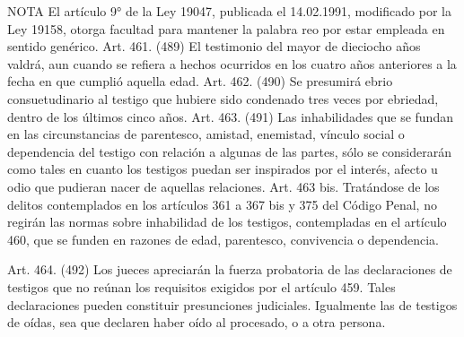 NOTA
    El artículo 9° de la Ley 19047, publicada el 14.02.1991, modificado por la Ley 19158, otorga facultad para mantener la palabra reo por estar empleada en sentido genérico.
    Art. 461. (489) El testimonio del mayor de dieciocho años valdrá, aun cuando se refiera a hechos ocurridos en los cuatro años anteriores a la fecha en que cumplió aquella edad.
    Art. 462. (490) Se presumirá ebrio consuetudinario al testigo que hubiere sido condenado tres veces por ebriedad, dentro de los últimos cinco años.
    Art. 463. (491) Las inhabilidades que se fundan en las circunstancias de parentesco, amistad, enemistad, vínculo social o dependencia del testigo con relación a algunas de las partes, sólo se considerarán como tales en cuanto los testigos puedan ser inspirados por el interés, afecto u odio que pudieran nacer de aquellas relaciones.
    Art. 463 bis. Tratándose de los delitos contemplados en los artículos 361 a 367 bis y 375 del Código Penal, no regirán las normas sobre inhabilidad de los testigos, contempladas en el artículo 460, que se funden en razones de edad, parentesco, convivencia o dependencia.

    Art. 464. (492) Los jueces apreciarán la fuerza probatoria de las declaraciones de testigos que no reúnan los requisitos exigidos por el artículo 459.
    Tales declaraciones pueden constituir presunciones judiciales.
    Igualmente las de testigos de oídas, sea que declaren haber oído al procesado, o a otra persona.


